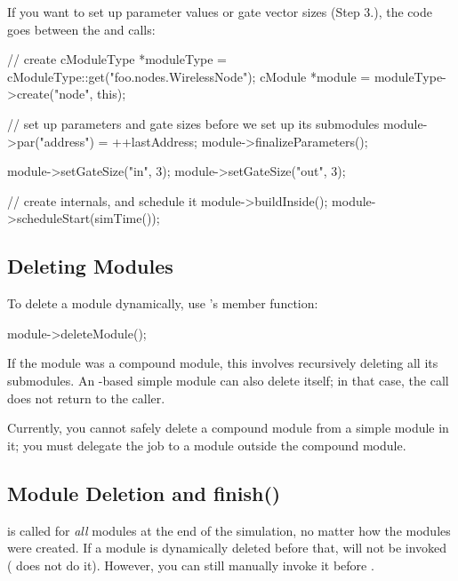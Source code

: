 If you want to set up parameter values or gate vector sizes (Step 3.),
the code goes between the  and
 calls:

\begin{cpp}
// create
cModuleType *moduleType = cModuleType::get("foo.nodes.WirelessNode");
cModule *module = moduleType->create("node", this);

// set up parameters and gate sizes before we set up its submodules
module->par("address") = ++lastAddress;
module->finalizeParameters();

module->setGateSize("in", 3);
module->setGateSize("out", 3);

// create internals, and schedule it
module->buildInside();
module->scheduleStart(simTime());
\end{cpp}


\subsection{Deleting Modules}
\label{sec:simple-modules:deleting-modules}

To delete a module dynamically, use
's  member function:

\begin{cpp}
module->deleteModule();
\end{cpp}

If the module was a compound module, this involves recursively
deleting all its submodules. An -based simple module
can also delete itself; in that case, the  call
does not return to the caller.

Currently, you cannot safely delete a compound module from a simple module
in it; you must delegate the job to a module outside the compound
module.


\subsection{Module Deletion and finish()}
\label{sec:simple-modules:module-deletion-and-finish}

 is called for \textit{all} modules at the end of the
simulation, no matter how the modules were created. If a module is
dynamically deleted before that,  will not be invoked
( does not do it). However, you can still manually
invoke it before .


